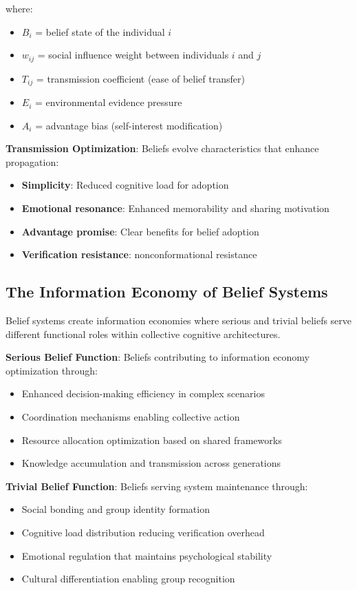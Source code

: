 \documentclass[12pt,a4paper]{article}
\begin{document}
where:
\begin{itemize}
\item $B_i$ = belief state of the individual $i$
\item $w_{ij}$ = social influence weight between individuals $i$ and $j$
\item $T_{ij}$ = transmission coefficient (ease of belief transfer)
\item $E_i$ = environmental evidence pressure
\item $A_i$ = advantage bias (self-interest modification)
\end{itemize}

\textbf{Transmission Optimization}: Beliefs evolve characteristics that enhance propagation:
\begin{itemize}
\item \textbf{Simplicity}: Reduced cognitive load for adoption
\item \textbf{Emotional resonance}: Enhanced memorability and sharing motivation  
\item \textbf{Advantage promise}: Clear benefits for belief adoption
\item \textbf{Verification resistance}: nonconformational resistance 
\end{itemize}

\subsection{The Information Economy of Belief Systems}

Belief systems create information economies where serious and trivial beliefs serve different functional roles within collective cognitive architectures.

\textbf{Serious Belief Function}: Beliefs contributing to information economy optimization through:
\begin{itemize}
\item Enhanced decision-making efficiency in complex scenarios
\item Coordination mechanisms enabling collective action
\item Resource allocation optimization based on shared frameworks
\item Knowledge accumulation and transmission across generations
\end{itemize}

\textbf{Trivial Belief Function}: Beliefs serving system maintenance through:
\begin{itemize}
\item Social bonding and group identity formation
\item Cognitive load distribution reducing verification overhead
\item Emotional regulation that maintains psychological stability
\item Cultural differentiation enabling group recognition
\end{itemize}
\end{document}
